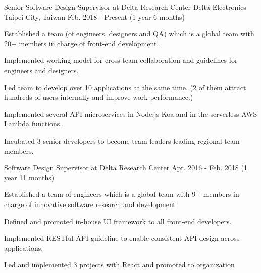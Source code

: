 

\begin{cventries}

  \cventry
    {Senior Software Design Supervisor at Delta Research Center} %
    {Delta Electronics} %
    {Taipei City, Taiwan} %
    {Feb. 2018 - Present (1 year 6 months)} %
    {
      \begin{cvitems} %
        \item {Established a team (of engineers, designers and QA) which is a global team with 20+ members in charge of front-end development. }
        \item {Implemented working model for cross team collaboration and guidelines for engineers and designers.}
        \item {Led team to develop over 10 applications at the same time. (2 of them attract hundreds of users internally and improve work performance.)}
        \item {Implemented several API microservices in Node.js Koa and in the serverless AWS Lambda functions.}
        \item {Incubated 3 senior developers to become team leaders leading regional team members.}
      \end{cvitems}
    }

  \cventry
    {Software Design Supervisor at Delta Research Center} %
    {} %
    {} %
    {Apr. 2016 - Feb. 2018 (1 year 11 months)} %
    {
      \begin{cvitems} %
        \item {Established a team of engineers which is a global team with 9+ members in charge of innovative software research and development}
        \item {Defined and promoted in-house UI framework to all front-end developers.}
        \item {Implemented RESTful API guideline to enable consistent API design across applications.}
        \item {Led and implemented 3 projects with React and promoted to organization}
      \end{cvitems}
    }


\end{cventries}
